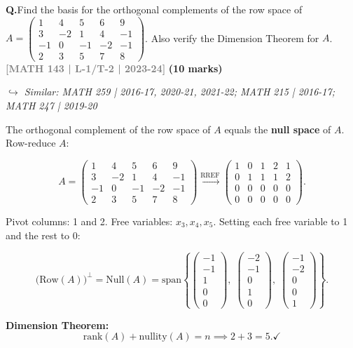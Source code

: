 \documentclass[12pt,a3paper]{article}
\newcommand{\yr}[1]{\hfill\textcolor{gray}{\small\textbf{[#1]}}}
\newcommand{\mk}[1]{\textcolor{orange!70!black}{\small\textbf{(#1 marks)}}}
\newcommand{\variant}[1]{\par\vspace{1pt}\textcolor{blue!50!black}%
  {\footnotesize\textit{$\hookrightarrow$ Similar: #1}}}
\newcounter{qnum}
\newcommand{\Q}[1]{%
  \needspace{4\baselineskip}
  \refstepcounter{qnum}
  \vspace{6pt}
  \noindent\textbf{Q\theqnum.}\enspace #1\par
}
\begin{document}
\Q{Find the basis for the orthogonal complements of the row space of \\$A = \begin{pmatrix} 1 & 4 & 5 & 6 & 9 \\ 3 & -2 & 1 & 4 & -1 \\ -1 & 0 & -1 & -2 & -1 \\ 2 & 3 & 5 & 7 & 8 \end{pmatrix}$. Also verify the Dimension Theorem for $A$.
\yr{MATH 143 | L-1/T-2 | 2023-24} \mk{10}
\variant{MATH 259 | 2016-17, 2020-21, 2021-22; MATH 215 | 2016-17; MATH 247 | 2019-20}}

\begin{tcolorbox}[enhanced,breakable,
  colback=cD!4,colframe=cD,boxrule=0.8pt,arc=5pt,
  title={\textbf{Answer --- Orthogonal Complement of Row Space \& Dimension Theorem}},
  fonttitle=\bfseries\color{white},colbacktitle=cD]

The orthogonal complement of the row space of $A$ equals the \textbf{null space} of $A$.
Row-reduce $A$:

\[
A = \begin{pmatrix}1&4&5&6&9\\3&-2&1&4&-1\\-1&0&-1&-2&-1\\2&3&5&7&8\end{pmatrix}
\xrightarrow{\text{RREF}}
\begin{pmatrix}1&0&1&2&1\\0&1&1&1&2\\0&0&0&0&0\\0&0&0&0&0\end{pmatrix}.
\]

Pivot columns: 1 and 2. Free variables: $x_3,x_4,x_5$.
Setting each free variable to 1 and the rest to 0:

\[
\bigl(\mathrm{Row}(A)\bigr)^\perp = \mathrm{Null}(A)
= \mathrm{span}\!\left\{
  \begin{pmatrix}-1\\-1\\1\\0\\0\end{pmatrix},\;
  \begin{pmatrix}-2\\-1\\0\\1\\0\end{pmatrix},\;
  \begin{pmatrix}-1\\-2\\0\\0\\1\end{pmatrix}
\right\}.
\]

\textbf{Dimension Theorem:}
\[
\mathrm{rank}(A) + \mathrm{nullity}(A) = n \implies 2 + 3 = 5. \checkmark
\]

\end{tcolorbox}
\end{document}
